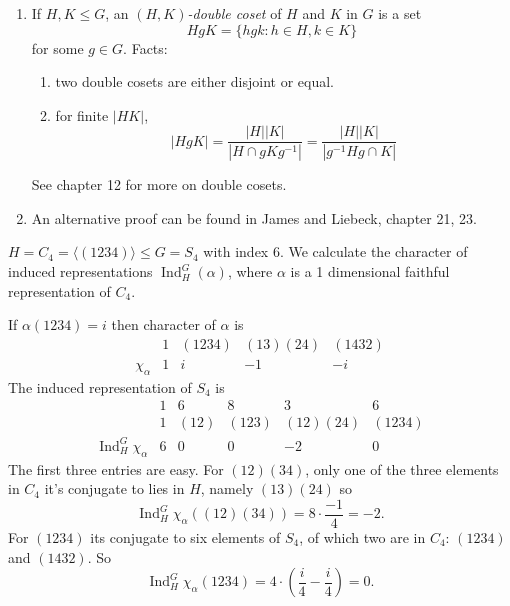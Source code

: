 \documentclass[a4paper]{article}
\DeclareMathOperator{\Ind}{Ind} %
\theoremstyle{definition}
\begin{document}
\begin{remark}\leavevmode
  \begin{enumerate}
  \item If \(H, K \leq G\), an \emph{\((H, K)\)-double coset} of \(H\) and \(K\) in \(G\) is a set
    \[
      HgK = \{hgk: h \in H, k \in K\}
    \]
    for some \(g \in G\). Facts:
    \begin{enumerate}
    \item two double cosets are either disjoint or equal.
    \item for finite \(|HK|\),
      \[
        |H g K|
        = \frac{|H| |K|}{|H \cap g K g^{-1}|}
        = \frac{|H| |K|}{|g^{-1} H g  \cap K|}
      \]
    \end{enumerate}
    See chapter 12 for more on double cosets.
  \item An alternative proof can be found in James and Liebeck, chapter 21, 23.
  \end{enumerate}
\end{remark}

\begin{eg}
  \(H = C_4 = \langle (1234) \rangle \leq G = S_4\) with index \(6\). We calculate the character of induced representations \(\Ind_H^G(\alpha)\), where \(\alpha\) is a 1 dimensional faithful representation of \(C_4\).

  If \(\alpha(1234) = i\) then character of \(\alpha\) is
  \[
    \begin{array}{r|cccc}
      & 1 & (1234) & (13)(24) & (1432) \\ \hline
      \chi_\alpha & 1 & i & -1 & -i
    \end{array}
  \]
  The induced representation of \(S_4\) is
  \[
    \begin{array}{r|cccccc}
      & 1 & 6 & 8 & 3 & 6 \\
      & 1 & (12) & (123) & (12)(24) & (1234) \\ \hline
      \Ind_H^G \chi_\alpha  & 6 & 0 & 0 & -2 & 0
    \end{array}
  \]
  The first three entries are easy. For \((12)(34)\), only one of the three elements in \(C_4\) it's conjugate to lies in \(H\), namely \((13)(24)\) so
  \[
    \Ind_H^G \chi_\alpha ((12)(34)) = 8 \cdot \frac{-1}{4} = -2.
  \]
  For \((1234)\) its conjugate to six elements of \(S_4\), of which two are in \(C_4\): \((1234)\) and \((1432)\). So
  \[
    \Ind_H^G \chi_\alpha (1234) = 4 \cdot \left(\frac{i}{4} - \frac{i}{4} \right) = 0.
  \]
\end{eg}
\end{document}

